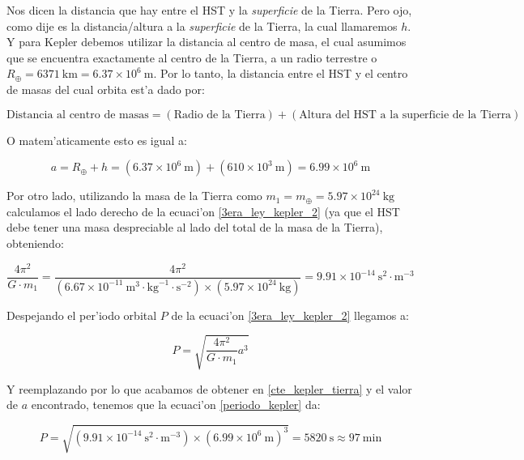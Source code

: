 \documentclass{article}
\begin{document}
\begin{enumerate}[a)]
\begin{enumerate}[i)]
Nos dicen la distancia que hay entre el HST y la \emph{superficie} de la Tierra. Pero ojo, como dije es la distancia/altura a la \emph{superficie} de la Tierra, la cual llamaremos $h	$. Y para Kepler debemos utilizar la distancia al centro de masa, el cual asumimos que se encuentra exactamente al centro de la Tierra, a un radio terrestre o $R_\oplus = 6371 \ \text{km} = 6.37 \times 10^6 \ \text{m}$. Por lo tanto, la distancia entre el HST y el centro de masas del cual orbita est'a dado por:

\begin{equation*}
\text{Distancia al centro de masas} = (\text{Radio de la Tierra}) + (\text{Altura del HST a la superficie de la Tierra})
\end{equation*}

O matem'aticamente esto es igual a:

\begin{equation*}
a = R_\oplus + h = (6.37 \times 10^6 \ \text{m}) + (610 \times 10^3 \ \text{m}) = 6.99 \times 10^6 \ \text{m}
\end{equation*} 

Por otro lado, utilizando la masa de la Tierra como $m_1 = m_\oplus = 5.97 \times 10^{24} \ \text{kg}$ calculamos el lado derecho de la ecuaci'on \eqref{3era_ley_kepler_2} (ya que el HST debe tener una masa despreciable al lado del total de la masa de la Tierra), obteniendo:

\begin{equation} \label{cte_kepler_tierra}
\frac{4 \pi^2}{G \cdot m_1} = \frac{4 \pi^2}{(6.67 \times 10^{-11} \ \text{m}^3 \cdot \text{kg}^{-1} \cdot \text{s}^{-2}) \times (5.97 \times 10^{24} \ \text{kg})} = 9.91 \times 10^{-14} \ \text{s}^2 \cdot \text{m}^{-3} 
\end{equation}

Despejando el per'iodo orbital $P$ de la ecuaci'on \eqref{3era_ley_kepler_2} llegamos a:

\begin{equation} \label{periodo_kepler}
P = \sqrt{\frac{4 \pi^2}{G \cdot m_1} a^3}
\end{equation}

Y reemplazando por lo que acabamos de obtener en \eqref{cte_kepler_tierra} y  el valor de $a$ encontrado, tenemos que la ecuaci'on \eqref{periodo_kepler} da:

\begin{equation}
P = \sqrt{(9.91 \times 10^{-14} \ \text{s}^2 \cdot \text{m}^{-3}) \times (6.99 \times 10^6 \ \text{m})^3} = 5820 \ \text{s} \approx 97 \ \text{min}
\end{equation}


\end{enumerate}
\end{enumerate}
\end{document}
